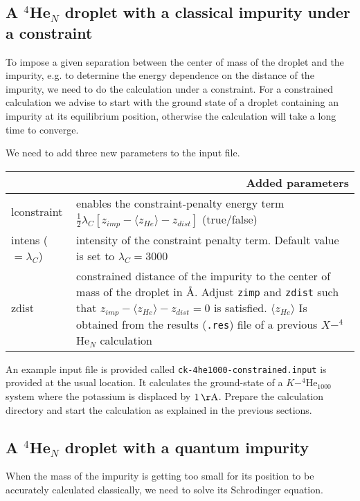 \documentclass[10pt,a4paper]{article}
\begin{document}
	\subsection{A $^4$He$_{N}$ droplet with a classical impurity under a constraint}\label{sec:ck-constr}
	
	To impose a given separation between the center of mass of the droplet and the impurity, e.g. to determine the energy dependence on the distance of the impurity, we need to do the calculation under a constraint. For a constrained calculation we advise to start with the ground state of a droplet containing an impurity at its equilibrium position, otherwise the calculation will take a long time to converge.
	
	We need to add three new parameters to the input file.
	\begin{center}
		\begin{tabular}{l|p{9.25cm}}
			\multicolumn{2}{r}{\textbf{Added parameters}} \\
			\hline\hline
			lconstraint 			& enables the constraint-penalty energy term $\frac{1}{2}\lambda_C\left[ z_{imp}-\langle z_{He}\rangle -z_{dist}\right] $ (true/false) \\
			intens ($=\lambda_C$)			& intensity of the constraint penalty term. Default value is set to $\lambda_C=3000$ \\
			zdist 			& constrained distance of the impurity to the center of mass of the droplet in \AA. Adjust \verb|zimp| and \verb|zdist| such that $z_{imp}-\langle z_{He}\rangle -z_{dist}=0$ is satisfied. $\langle z_{He}\rangle$ Is obtained from the results (\verb|.res|) file of a previous $X-^4$He$_N$ calculation \\
		\end{tabular}
	\end{center}
	\vspace{0.2cm}
	An example input file is provided called \verb|ck-4he1000-constrained.input| is provided at the usual location. It calculates the ground-state of a $K-^4$He$_{1000}$ system where the potassium is displaced by $1\,\mathrm{\AA}$. Prepare the calculation directory and start the calculation as explained in the previous sections.
	
	\subsection{A $^4$He$_{N}$ droplet with a quantum impurity}
	When the mass of the impurity is getting too small for its position to be accurately calculated classically, we need to solve its Schrodinger equation. 
	
\end{document}
